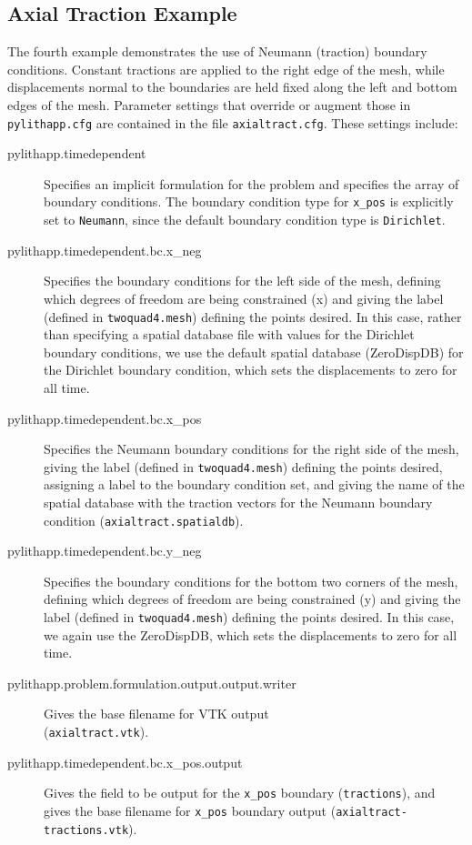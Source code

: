 \subsection{\label{sub:Tutorial-twoquad4-traction}Axial Traction Example}

The fourth example demonstrates the use of Neumann (traction) boundary
conditions. Constant tractions are applied to the right edge of the
mesh, while displacements normal to the boundaries are held fixed
along the left and bottom edges of the mesh. Parameter settings that
override or augment those in \texttt{pylithapp.cfg} are contained
in the file \texttt{axialtract.cfg}. These settings include:
\begin{description}
\item [{pylithapp.timedependent}] Specifies an implicit formulation for
the problem and specifies the array of boundary conditions. The boundary
condition type for \texttt{x\_pos} is explicitly set to \texttt{Neumann},
since the default boundary condition type is \texttt{Dirichlet}.
\item [{pylithapp.timedependent.bc.x\_neg}] Specifies the boundary conditions
for the left side of the mesh, defining which degrees of freedom are
being constrained (x) and giving the label (defined in \texttt{twoquad4.mesh})
defining the points desired. In this case, rather than specifying
a spatial database file with values for the Dirichlet boundary conditions,
we use the default spatial database (ZeroDispDB) for the Dirichlet
boundary condition, which sets the displacements to zero for all time.
\item [{pylithapp.timedependent.bc.x\_pos}] Specifies the Neumann boundary
conditions for the right side of the mesh, giving the label (defined
in \texttt{twoquad4.mesh}) defining the points desired, assigning
a label to the boundary condition set, and giving the name of the
spatial database with the traction vectors for the Neumann boundary
condition (\texttt{axialtract.spatialdb}).
\item [{pylithapp.timedependent.bc.y\_neg}] Specifies the boundary conditions
for the bottom two corners of the mesh, defining which degrees of
freedom are being constrained (y) and giving the label (defined in
\texttt{twoquad4.mesh}) defining the points desired. In this case,
we again use the ZeroDispDB, which sets the displacements to zero
for all time.
\item [{pylithapp.problem.formulation.output.output.writer}] Gives the
base filename for VTK output \\
(\texttt{axialtract.vtk}).
\item [{pylithapp.timedependent.bc.x\_pos.output}] Gives the field to be
output for the \texttt{x\_pos} boundary (\texttt{tractions}), and
gives the base filename for \texttt{x\_pos} boundary output (\texttt{axialtract-tractions.vtk}).
\end{description}
